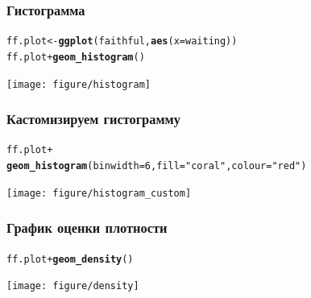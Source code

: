 \documentclass[compress]{beamer}\usepackage[]{graphicx}\usepackage[]{color}
\makeatletter
\newcommand{\hlnum}[1]{\textcolor[rgb]{0.686,0.059,0.569}{#1}}%
\newcommand{\hlstr}[1]{\textcolor[rgb]{0.192,0.494,0.8}{#1}}%
\newcommand{\hlopt}[1]{\textcolor[rgb]{0,0,0}{#1}}%
\newcommand{\hlstd}[1]{\textcolor[rgb]{0.345,0.345,0.345}{#1}}%
\newcommand{\hlkwb}[1]{\textcolor[rgb]{0.69,0.353,0.396}{#1}}%
\newcommand{\hlkwc}[1]{\textcolor[rgb]{0.333,0.667,0.333}{#1}}%
\newcommand{\hlkwd}[1]{\textcolor[rgb]{0.737,0.353,0.396}{\textbf{#1}}}%
\newenvironment{kframe}{%
 \def\at@end@of@kframe{}%
 \ifinner\ifhmode%
  \def\at@end@of@kframe{\end{minipage}}%
  \begin{minipage}{\columnwidth}%
 \fi\fi%
 \def\FrameCommand##1{\hskip\@totalleftmargin \hskip-\fboxsep
 \colorbox{shadecolor}{##1}\hskip-\fboxsep
     \hskip-\linewidth \hskip-\@totalleftmargin \hskip\columnwidth}%
 \MakeFramed {\advance\hsize-\width
   \@totalleftmargin\z@ \linewidth\hsize
   \@setminipage}}%
 {\par\unskip\endMakeFramed%
 \at@end@of@kframe}
\newenvironment{knitrout}{}{} %
\makeatother
\begin{document}
\begin{frame}[fragile]
\frametitle{Гистограмма}
\begin{knitrout}\footnotesize
{}\color{fgcolor}\begin{kframe}
\begin{alltt}
\hlstd{ff.plot} \hlkwb{<-} \hlkwd{ggplot}\hlstd{(faithful,} \hlkwd{aes}\hlstd{(}\hlkwc{x} \hlstd{= waiting))}
\hlstd{ff.plot} \hlopt{+} \hlkwd{geom_histogram}\hlstd{()}
\end{alltt}
\end{kframe}
\texttt{[image: figure/histogram]} 

\end{knitrout}

\end{frame}

\begin{frame}[fragile]
\frametitle{Кастомизируем гистограмму}
\begin{knitrout}\footnotesize
{}\color{fgcolor}\begin{kframe}
\begin{alltt}
\hlstd{ff.plot} \hlopt{+}
  \hlkwd{geom_histogram}\hlstd{(}\hlkwc{binwidth} \hlstd{=} \hlnum{6}\hlstd{,} \hlkwc{fill} \hlstd{=} \hlstr{"coral"}\hlstd{,} \hlkwc{colour} \hlstd{=} \hlstr{"red"}\hlstd{)}
\end{alltt}
\end{kframe}
\texttt{[image: figure/histogram\_custom]} 

\end{knitrout}

\end{frame}

\begin{frame}[fragile]
\frametitle{График оценки плотности}
\begin{knitrout}\footnotesize
{}\color{fgcolor}\begin{kframe}
\begin{alltt}
\hlstd{ff.plot} \hlopt{+} \hlkwd{geom_density}\hlstd{()}
\end{alltt}
\end{kframe}
\texttt{[image: figure/density]} 

\end{knitrout}

\end{frame}
\end{document}
